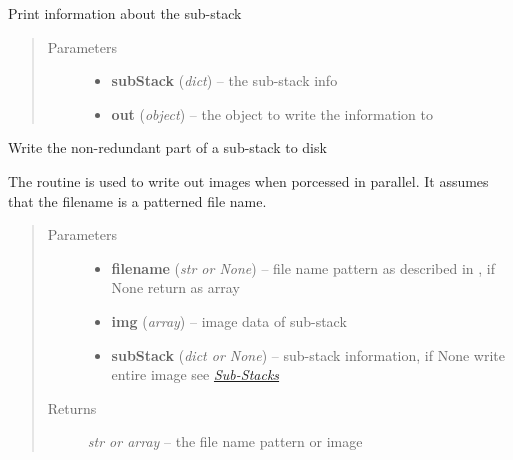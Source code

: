 \documentclass[letterpaper,10pt,english]{sphinxmanual}
\begin{document}
\begin{fulllineitems}
\label{api/ClearMap.ImageProcessing:ClearMap.ImageProcessing.StackProcessing.printSubStackInfo}
Print information about the sub-stack
\begin{quote}\begin{description}
\item[{Parameters}] \leavevmode\begin{itemize}
\item {} 
\textbf{subStack} (\emph{dict}) --
the sub-stack info

\item {} 
\textbf{out} (\emph{object}) --
the object to write the information to

\end{itemize}

\end{description}\end{quote}

\end{fulllineitems}


\begin{fulllineitems}
\label{api/ClearMap.ImageProcessing:ClearMap.ImageProcessing.StackProcessing.writeSubStack}
Write the non-redundant part of a sub-stack to disk

The routine is used to write out images when porcessed in parallel.
It assumes that the filename is a patterned file name.
\begin{quote}\begin{description}
\item[{Parameters}] \leavevmode\begin{itemize}
\item {} 
\textbf{filename} (\emph{str or None}) --
file name pattern as described in
, if None return as array

\item {} 
\textbf{img} (\emph{array}) --
image data of sub-stack

\item {} 
\textbf{subStack} (\emph{dict or None}) --
sub-stack information, if None write entire image
see {\hyperref[api/ClearMap.ImageProcessing:substack]{\emph{Sub-Stacks}}}

\end{itemize}

\item[{Returns}] \leavevmode
\emph{str or array} --
the file name pattern or image

\end{description}\end{quote}

\end{fulllineitems}
\end{document}
